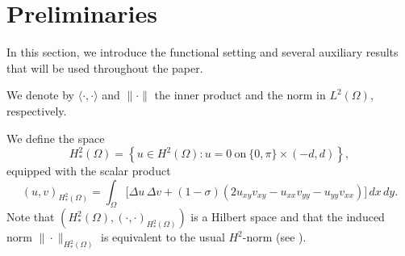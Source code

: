 \documentclass[12pt]{article}
\numberwithin{equation}{section}
\begin{document}
\section{Preliminaries}
In this section, we introduce the functional setting and several auxiliary
results that will be used throughout the paper.

We denote by $\langle\cdot,\cdot\rangle$
and $\|\cdot\|$ the inner product and the norm in $L^2(\Omega)$,
respectively.

We define the space
\[
H^2_*(\Omega)=\left\{u\in H^2(\Omega): u=0 \ \text{on}\ \{0,\pi\}\times(-d,d)\right\},
\]
equipped with the scalar product
\[
(u,v)_{H^2_*(\Omega)}=\int_\Omega
\big[\Delta u\,\Delta v
+(1-\sigma)(2u_{xy}v_{xy}-u_{xx}v_{yy}-u_{yy}v_{xx})\big]\,dx\,dy.
\]
Note that $(H^2_*(\Omega),(\cdot,\cdot)_{H^2_*(\Omega)})$ is a Hilbert space and
that the induced norm $\|\cdot\|_{H^2_*(\Omega)}$ is equivalent to the usual
$H^2$-norm (see \cite{Ferr1}).
\end{document}

